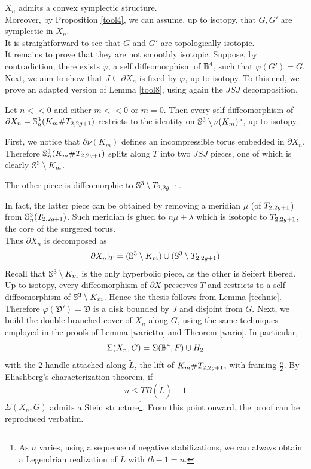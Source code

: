 $X_n$ admits a convex symplectic structure. \\ Moreover, by Proposition \ref{tool4}, we can assume, up to isotopy, that $G, G'$ are symplectic in $X_n$. \\
It is straightforward to see that $G$ and $G'$ are topologically isotopic. \\
It remains to prove that they are not smoothly isotopic. Suppose, by contradiction, there exists $\varphi$, a self diffeomorphism of $\mathbb{B}^4$, such that $\varphi(G') = G$. \\
Next, we aim to show that $J \subseteq \partial X_n$ is fixed by $\varphi$, up to isotopy.
To this end, we prove an adapted version of Lemma \ref{tool8}, using again the $JSJ$ decomposition. 
\begin{lem} Let $n<<0$ and either $m<<0$ or $m=0$. Then every self diffeomorphism of $\partial X_n= \mathbb{S}^3_n(K_m \# T_{2, 2g+1})$ restricts to the identity on $\mathbb{S}^3 \setminus \nu(K_m)^{\mathrm{o}}$, up to isotopy.
\end{lem}
\proof
First, we notice that $\partial \nu(K_m)$ defines an incompressible torus embedded in $\partial X_n$. Therefore $\mathbb{S}^3_n(K_m \# T_{2, 2g+1})$ splits along $T$ into two $JSJ$ pieces, one of which is clearly $\mathbb{S}^3 \setminus K_m$. 
\begin{cla} The other piece is diffeomorphic to $\mathbb{S}^3 \setminus T_{2, 2g+1}$.
\end{cla}
In fact, the latter piece can be obtained by removing a meridian $\mu$ (of $T_{2, 2g+1}$) from $\mathbb{S}^3_n(T_{2, 2g+1})$. Such meridian is glued to $n\mu+\lambda$ which is isotopic to $T_{2, 2g+1}$, the core of the surgered torus. \\
Thus $\partial X_n$ is decomposed as $$
\partial X_n|_T = (\mathbb{S}^3 \setminus K_m) \cup (\mathbb{S}^3 \setminus T_{2, 2g+1})
$$
Recall that $\mathbb{S}^3 \setminus K_m$ is the only hyperbolic piece, as the other is Seifert fibered. Up to isotopy, every diffeomorphism of $\partial X$ preserves $T$ and restricts to a self-diffeomorphism of $\mathbb{S}^3 \setminus K_m$. Hence the thesis follows from Lemma \ref{technic}.
\endproof
Therefore $\varphi (\mathfrak{D'}) = \mathfrak{D}$ is a disk bounded by $J$ and disjoint from $G$. Next, we build the double branched cover of $X_n$ along $G$, using the same techniques employed in the proofs of Lemma \ref{warietto} and Theorem \ref{wario}. In particular, $$
\Sigma(X_n, G) = \Sigma(\mathbb{B}^4, F) \cup H_2
$$
with the $2$-handle attached along $\tilde{L}$, the lift of $K_m\# T_{2, 2g+1}$, with framing $\frac{n}{2}$. By Eliashberg's characterization theorem, if $$
n \leq TB(\tilde{L})-1
$$
$\Sigma(X_n, G)$ admits a Stein structure\footnote{As $n$ varies, using a sequence of negative stabilizations, we can always obtain a Legendrian realization of $\tilde{L}$ with $tb-1 = n$.}. From this point onward, the proof can be reproduced verbatim.
\endproof